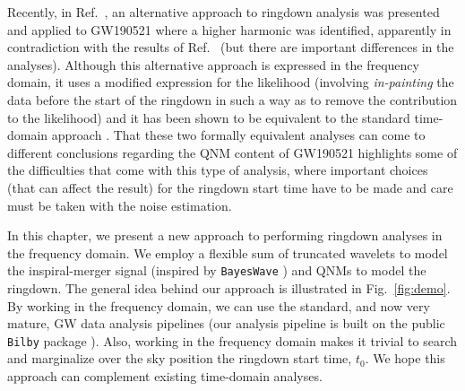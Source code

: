 Recently, in Ref.~\cite{Capano:2021etf}, an alternative approach to ringdown analysis was presented and applied to GW190521 where a higher harmonic was identified, apparently in contradiction with the results of Ref.~\cite{LIGOScientific:2020tif} (but there are important differences in the analyses). 
Although this alternative approach is expressed in the frequency domain, it uses a modified expression for the likelihood (involving \emph{in-painting} the data before the start of the ringdown in such a way as to remove the contribution to the likelihood) and it has been shown to be equivalent to the standard time-domain approach \cite{Isi:2021iql}.
That these two formally equivalent analyses \cite{LIGOScientific:2020tif, Capano:2021etf} can come to different conclusions regarding the QNM content of GW190521 highlights some of the difficulties that come with this type of analysis, where important choices (that can affect the result) for the ringdown start time have to be made and care must be taken with the noise estimation.

In this chapter, we present a new approach to performing ringdown analyses in the frequency domain. 
We employ a flexible sum of truncated wavelets to model the inspiral-merger signal (inspired by \texttt{BayesWave} \cite{Cornish:2014kda, Cornish:2020dwh}) and QNMs to model the ringdown.
The general idea behind our approach is illustrated in Fig.~\ref{fig:demo}.
By working in the frequency domain, we can use the standard, and now very mature, GW data analysis pipelines (our analysis pipeline is built on the public \texttt{Bilby} package \cite{Ashton:2018jfp}).
Also, working in the frequency domain makes it trivial to search and marginalize over the sky position the ringdown start time, $t_0$. 
We hope this approach can complement existing time-domain analyses.

